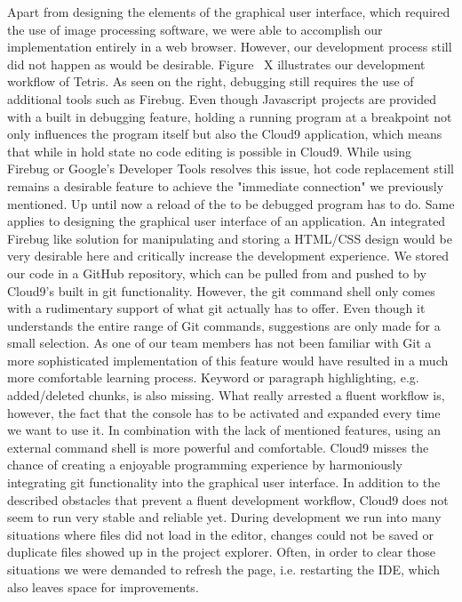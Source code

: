 Apart from designing the elements of the graphical user interface, which required the use of image processing software, we were able to accomplish our implementation entirely in a web browser. However, our development process still did not happen as would be desirable. Figure ~\needcite X illustrates our development workflow of Tetris. As seen on the right, debugging still requires the use of additional tools such as Firebug. Even though Javascript projects are provided with a built in debugging feature, holding a running program at a breakpoint not only influences the program itself but also the Cloud9 application, which means that while in hold state no code editing is possible in Cloud9. While using Firebug or Google's Developer Tools resolves this issue, hot code replacement still remains a desirable feature to achieve the "immediate connection" we previously mentioned. Up until now a reload of the to be debugged program has to do. Same applies to designing the graphical user interface of an application. An integrated Firebug like solution for manipulating and storing a HTML/CSS design would be very desirable here and critically increase the development experience. We stored our code in a GitHub repository, which can be pulled from and pushed to by Cloud9's built in git functionality. However, the git command shell only comes with a rudimentary support of what git actually has to offer. Even though it understands the entire range of Git commands, suggestions are only made for a small selection. As one of our team members has not been familiar with Git a more sophisticated implementation of this feature would have resulted in a much more comfortable learning process. Keyword or paragraph highlighting, e.g. added/deleted chunks, is also missing. What really arrested a fluent workflow is, however, the fact that the console has to be activated and expanded every time we want to use it. In combination with the lack of mentioned features, using an external command shell is more powerful and comfortable. Cloud9 misses the chance of creating a enjoyable programming experience by harmoniously integrating git functionality into the graphical user interface. In addition to the described obstacles that prevent a fluent development workflow, Cloud9 does not seem to run very stable and reliable yet. During development we run into many situations where files did not load in the editor, changes could not be saved or duplicate files showed up in the project explorer. Often, in order to clear those situations we were demanded to refresh the page, i.e. restarting the IDE, which also leaves space for improvements.

